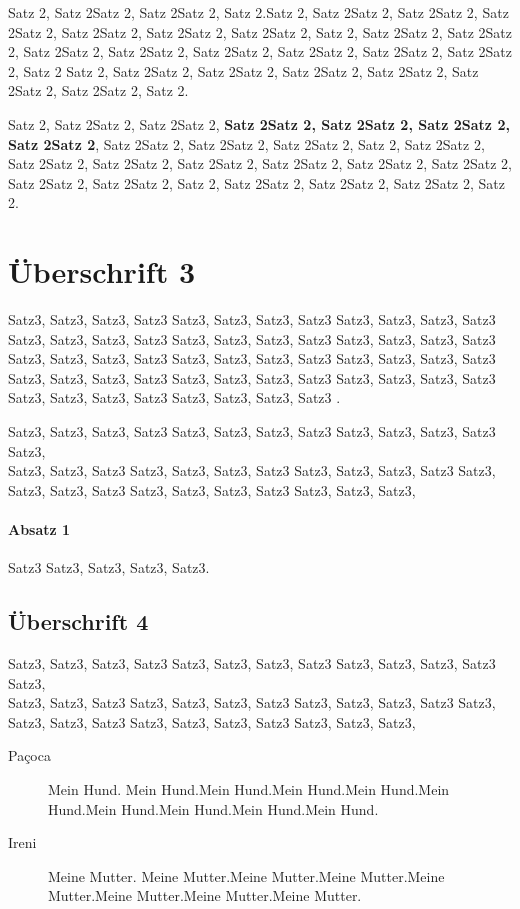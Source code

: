 \documentclass[pdftex, a4paper]{scrartcl}
\begin{document}
    Satz 2, Satz 2Satz 2, Satz 2Satz 2, Satz 2.Satz 2, Satz 2Satz 2, Satz 2Satz 2, Satz 2Satz 2, Satz 2Satz 2, Satz 2Satz 2, Satz 2Satz 2, 
    Satz 2, Satz 2Satz 2, Satz 2Satz 2, Satz 2Satz 2, Satz 2Satz 2, Satz 2Satz 2, Satz 2Satz 2, Satz 2Satz 2, Satz 2Satz 2, Satz 2
    Satz 2, Satz 2Satz 2, Satz 2Satz 2, Satz 2Satz 2, Satz 2Satz 2, Satz 2Satz 2, Satz 2Satz 2, Satz 2.


    Satz 2, Satz 2Satz 2, Satz 2Satz 2,  \textbf{Satz 2Satz 2, Satz 2Satz 2, Satz 2Satz 2, Satz 2Satz 2}, Satz 2Satz 2, Satz 2Satz 2, Satz 2Satz 2,
    Satz 2, Satz 2Satz 2, Satz 2Satz 2, Satz 2Satz 2, Satz 2Satz 2, Satz 2Satz 2, Satz 2Satz 2, Satz 2Satz 2, Satz 2Satz 2, Satz 2Satz 2, 
    Satz 2, Satz 2Satz 2, Satz 2Satz 2, Satz 2Satz 2, Satz 2.

    \section{Überschrift 3}

    Satz3, Satz3, Satz3, Satz3 Satz3, Satz3, Satz3, Satz3 Satz3, Satz3, Satz3, Satz3 Satz3, Satz3, Satz3, Satz3 Satz3, Satz3, Satz3, Satz3 
    Satz3, Satz3, Satz3, Satz3 Satz3, Satz3, Satz3, Satz3 Satz3, Satz3, Satz3, Satz3 Satz3, Satz3, Satz3, Satz3 Satz3, Satz3, Satz3, Satz3 
    Satz3, Satz3, Satz3, Satz3 Satz3, Satz3, Satz3, Satz3 Satz3, Satz3, Satz3, Satz3 Satz3, Satz3, Satz3, Satz3 .


    Satz3, Satz3, Satz3, Satz3 Satz3, Satz3, Satz3, Satz3 Satz3, Satz3, Satz3, Satz3 Satz3, \\
    Satz3, Satz3, Satz3 Satz3, Satz3, Satz3, Satz3 
    Satz3, Satz3, Satz3, Satz3 Satz3, Satz3, Satz3, Satz3 Satz3, Satz3, Satz3, Satz3 Satz3, Satz3, Satz3,
    
    \paragraph*{Absatz 1}
    Satz3 Satz3, Satz3, Satz3, Satz3.

    \subsection{Überschrift 4}
    Satz3, Satz3, Satz3, Satz3 Satz3, Satz3, Satz3, Satz3 Satz3, Satz3, Satz3, Satz3 Satz3, \\
    Satz3, Satz3, Satz3 Satz3, Satz3, Satz3, Satz3 
    Satz3, Satz3, Satz3, Satz3 Satz3, Satz3, Satz3, Satz3 Satz3, Satz3, Satz3, Satz3 Satz3, Satz3, Satz3,

    \begin{description}
        \item [Paçoca] Mein Hund. Mein Hund.Mein Hund.Mein Hund.Mein Hund.Mein Hund.Mein Hund.Mein Hund.Mein Hund.Mein Hund.
        \item [Ireni] Meine Mutter. Meine Mutter.Meine Mutter.Meine Mutter.Meine Mutter.Meine Mutter.Meine Mutter.Meine Mutter.
    \end{description}
    
\end{document}
